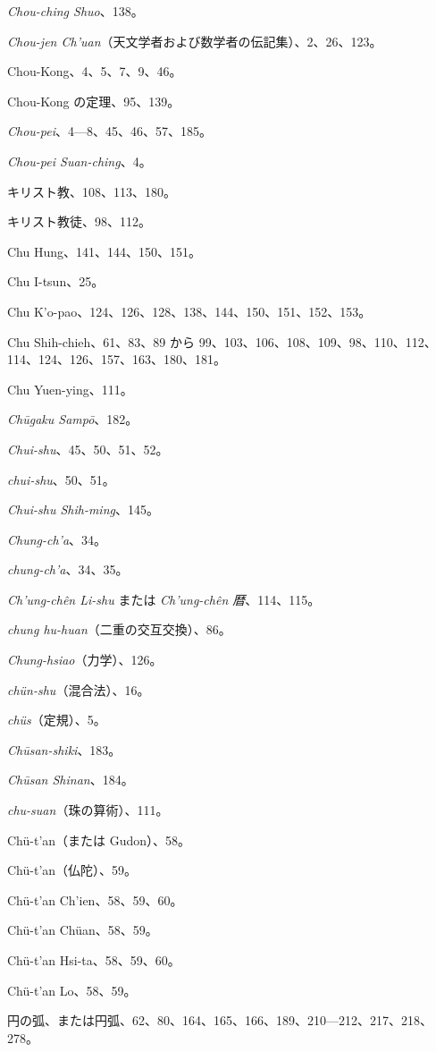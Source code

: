 \documentclass[11pt]{article}
\begin{document}
\emph{Chou-ching Shuo}、138。\par
\emph{Chou-jen Ch'uan}（天文学者および数学者の伝記集）、2、26、123。\par
Chou-Kong、4、5、7、9、46。\par
Chou-Kong の定理、95、139。\par
\emph{Chou-pei}、4---8、45、46、57、185。\par
\emph{Chou-pei Suan-ching}、4。\par
キリスト教、108、113、180。\par
キリスト教徒、98、112。\par
Chu Hung、141、144、150、151。\par
Chu I-tsun、25。\par
Chu K'o-pao、124、126、128、138、144、150、151、152、153。\par
Chu Shih-chieh、61、83、89 から 99、103、106、108、109、98、110、112、114、124、126、157、163、180、181。\par
Chu Yuen-ying、111。\par
\emph{Chūgaku Sampō}、182。\par
\emph{Chui-shu}、45、50、51、52。\par
\emph{chui-shu}、50、51。\par
\emph{Chui-shu Shih-ming}、145。\par
\emph{Chung-ch'a}、34。\par
\emph{chung-ch'a}、34、35。\par
\emph{Ch'ung-chên Li-shu} または \emph{Ch'ung-chên 暦}、114、115。\par
\emph{chung hu-huan}（二重の交互交換）、86。\par
\emph{Chung-hsiao}（力学）、126。\par
\emph{chün-shu}（混合法）、16。\par
\emph{chüs}（定規）、5。\par
\emph{Chūsan-shiki}、183。\par
\emph{Chūsan Shinan}、184。\par
\emph{chu-suan}（珠の算術）、111。\par
Chü-t'an（または Gudon）、58。\par
Chü-t'an（仏陀）、59。\par
Chü-t'an Ch'ien、58、59、60。\par
Chü-t'an Chüan、58、59。\par
Chü-t'an Hsi-ta、58、59、60。\par
Chü-t'an Lo、58、59。\par
円の弧、または円弧、62、80、164、165、166、189、210---212、217、218、278。\par
\end{document}
